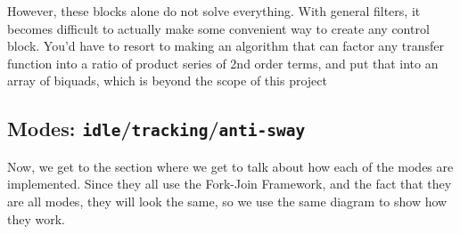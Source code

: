 \documentclass[letterpaper]{article}
\begin{document}
However, these blocks alone do not solve everything. With general filters, it becomes difficult to actually make some convenient way to create any control block. You'd have to resort to making an algorithm that can factor any transfer function into a ratio of product series of 2nd order terms, and put that into an array of biquads, which is beyond the scope of this project

\newpage

\subsection{Modes: \texttt{idle}/\texttt{tracking}/\texttt{anti-sway}}

Now, we get to the section where we get to talk about how each of the modes are implemented. Since they all use the Fork-Join Framework, and the fact that they are all modes, they will look the same, so we use the same diagram to show how they work.
\end{document}
